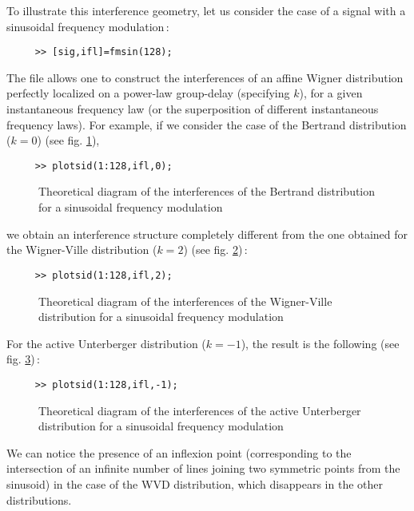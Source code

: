   To illustrate this interference geometry, let us consider the case of a
signal with a sinusoidal frequency modulation\,:
\begin{verbatim}
     >> [sig,ifl]=fmsin(128);
\end{verbatim}
The file  allows one to
construct the interferences of an affine Wigner distribution perfectly
localized on a power-law group-delay (specifying $k$), for a given
instantaneous frequency law (or the superposition of different
instantaneous frequency laws). For example, if we consider the case of the
Bertrand distribution ($k=0$) (see fig. \ref{En2fig10}),
\begin{verbatim}
     >> plotsid(1:128,ifl,0);
\end{verbatim}
\begin{figure}[htb]
\epsfxsize=10cm
\epsfysize=8cm
\centerline{}
\caption{\label{En2fig10}Theoretical diagram of the interferences of the
Bertrand distribution for a sinusoidal frequency modulation}
\end{figure}
we obtain an interference structure completely different from the one
obtained for the Wigner-Ville distribution ($k=2$) (see
fig. \ref{En2fig11})\,:
\begin{verbatim}
     >> plotsid(1:128,ifl,2);
\end{verbatim}
\begin{figure}[htb]
\epsfxsize=10cm
\epsfysize=8cm
\centerline{}
\caption{\label{En2fig11}Theoretical diagram of the interferences of the
Wigner-Ville distribution for a sinusoidal frequency modulation}
\end{figure}
For the active Unterberger distribution ($k=-1$), the result is the
following (see fig. \ref{En2fig12})\,: 
\begin{verbatim}
     >> plotsid(1:128,ifl,-1);
\end{verbatim}
\begin{figure}[htb]
\epsfxsize=10cm
\epsfysize=8cm
\centerline{}
\caption{\label{En2fig12}Theoretical diagram of the interferences of the
active Unterberger distribution for a sinusoidal frequency modulation}
\end{figure}

We can notice the presence of an inflexion point (corresponding to the
intersection of an infinite number of lines joining two symmetric points
from the sinusoid) in the case of the WVD distribution, which disappears in
the other distributions.

